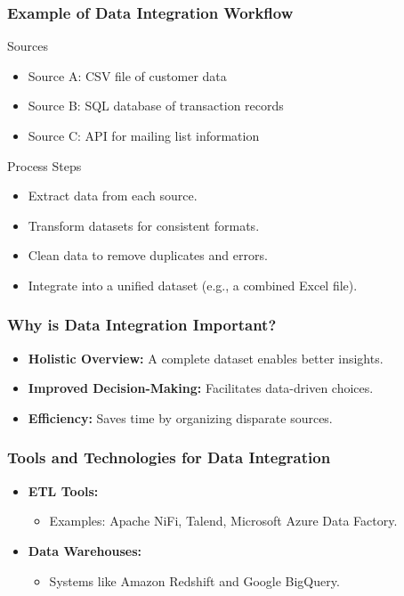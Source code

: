 \documentclass[aspectratio=169]{beamer}
\begin{document}
\begin{frame}[fragile]
    \frametitle{Example of Data Integration Workflow}
    \begin{block}{Sources}
        \begin{itemize}
            \item Source A: CSV file of customer data
            \item Source B: SQL database of transaction records
            \item Source C: API for mailing list information
        \end{itemize}
    \end{block}

    \begin{block}{Process Steps}
        \begin{itemize}
            \item Extract data from each source.
            \item Transform datasets for consistent formats.
            \item Clean data to remove duplicates and errors.
            \item Integrate into a unified dataset (e.g., a combined Excel file).
        \end{itemize}
    \end{block}
\end{frame}

\begin{frame}[fragile]
    \frametitle{Why is Data Integration Important?}
    \begin{itemize}
        \item \textbf{Holistic Overview:} A complete dataset enables better insights.
        \item \textbf{Improved Decision-Making:} Facilitates data-driven choices.
        \item \textbf{Efficiency:} Saves time by organizing disparate sources.
    \end{itemize}
\end{frame}

\begin{frame}[fragile]
    \frametitle{Tools and Technologies for Data Integration}
    \begin{itemize}
        \item \textbf{ETL Tools:} 
        \begin{itemize}
            \item Examples: Apache NiFi, Talend, Microsoft Azure Data Factory.
        \end{itemize}
        
        \item \textbf{Data Warehouses:}
        \begin{itemize}
            \item Systems like Amazon Redshift and Google BigQuery.
        \end{itemize}
    \end{itemize}
\end{frame}
\end{document}
